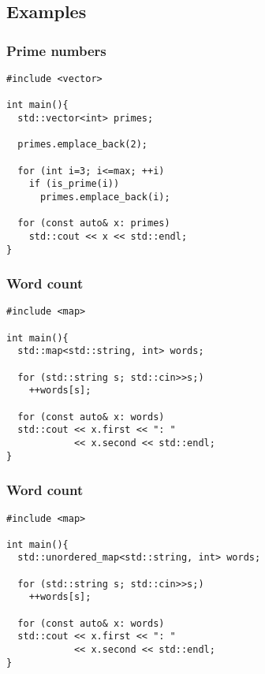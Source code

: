 \subsection{Examples}
\begin{frame}[fragile]
  \frametitle{Prime numbers}
\begin{lstlisting}
#include <vector>

int main(){
  std::vector<int> primes;
  
  primes.emplace_back(2);

  for (int i=3; i<=max; ++i)
    if (is_prime(i))
      primes.emplace_back(i);

  for (const auto& x: primes)
    std::cout << x << std::endl;
}
\end{lstlisting}
\end{frame}

\begin{frame}[fragile]
  \frametitle{Word count}
\begin{lstlisting}
#include <map>
  
int main(){
  std::map<std::string, int> words;
  
  for (std::string s; std::cin>>s;)
    ++words[s];

  for (const auto& x: words)
  std::cout << x.first << ": "
            << x.second << std::endl;
}
\end{lstlisting}
\end{frame}

\begin{frame}[fragile]
  \frametitle{Word count}
\begin{lstlisting}
#include <map>
  
int main(){
  std::unordered_map<std::string, int> words;
  
  for (std::string s; std::cin>>s;)
    ++words[s];

  for (const auto& x: words)
  std::cout << x.first << ": "
            << x.second << std::endl;
}
\end{lstlisting}
\end{frame}

